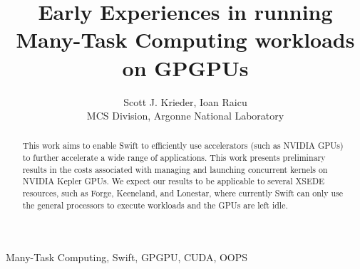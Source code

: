 \documentclass[conference]{IEEEtran}
\begin{document}
%
\title{Early Experiences in running Many-Task Computing workloads on GPGPUs}


\author{Scott J. Krieder,
Ioan Raicu\\
MCS Division, Argonne National Laboratory
}


\maketitle


\begin{abstract}
This work aims to enable Swift to efficiently use accelerators (such as NVIDIA GPUs) to further accelerate a wide range of applications. This work presents preliminary results in the costs associated with managing and launching concurrent kernels on NVIDIA Kepler GPUs. We expect our results to be applicable to several XSEDE resources, such as Forge, Keeneland, and Lonestar, where currently Swift can only use the general processors to execute workloads and the GPUs are left idle.
\end{abstract}

\begin{IEEEkeywords}
Many-Task Computing, Swift, GPGPU, CUDA, OOPS
\end{IEEEkeywords}

\IEEEpeerreviewmaketitle
\end{document}
